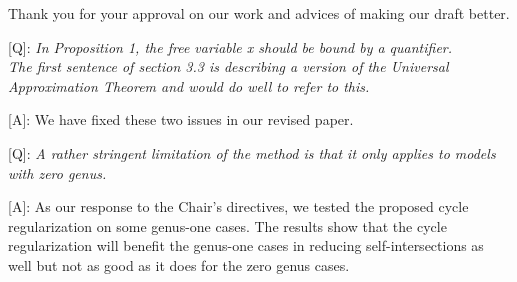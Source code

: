 \documentclass[10pt]{letter} %
\begin{document}
	Thank you for your approval on our work and advices of making our draft better.
	
	[Q]: \emph{In Proposition 1, the free variable x should be bound by a quantifier.
		\\The first sentence of section 3.3 is describing a version of the Universal Approximation Theorem and would do well to refer to this.}
	
	[A]: We have fixed these two issues in our revised paper. 
	
	[Q]: \emph{A rather stringent limitation of the method is that it only applies to models with zero genus.}
	
	[A]: As our response to the Chair's directives, we tested the proposed cycle regularization on some genus-one cases. The results show that the cycle regularization will benefit the genus-one cases in reducing self-intersections as well but not as good as it does for the zero genus cases.
\end{document}
